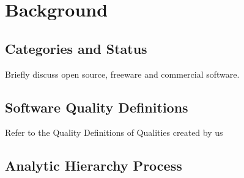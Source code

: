 \chapter{Background}
\label{ch_background}

\section{Categories and Status}

Briefly discuss open source, freeware and commercial software.

\section{Software Quality Definitions}

Refer to the Quality Definitions of Qualities created by us

\section{Analytic Hierarchy Process}